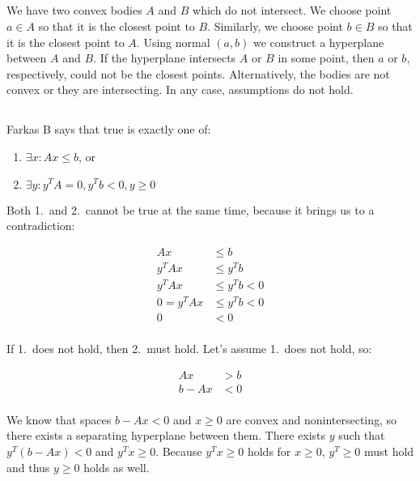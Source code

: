 \documentclass[a4paper,11pt,oneside,onecolumn]{article}
\begin{document}
\subsection{}

We have two convex bodies $A$ and $B$ which do not intersect. We choose point $a \in A$ so that it is the closest point
to $B$. Similarly, we choose
point $b \in B$ so that it is the closest point to $A$. Using normal $(a,b)$ we construct a hyperplane between $A$ and $B$.
If the hyperplane intersects $A$ or $B$ in some point, then $a$ or $b$, respectively, could not be the closest points.
Alternatively, the bodies are not convex or they are intersecting. In any case, assumptions do not hold.

\subsection{}

Farkas B says that true is exactly one of:
\begin{enumerate}
\item $\exists x: Ax \le b$, or
\item $\exists y: y^TA = 0, y^Tb < 0 , y \ge 0$
\end{enumerate}

Both 1.~and 2.~cannot be true at the same time, because it brings us to a contradiction:

\begin{align*}
Ax & \le b \\
y^TAx & \le y^Tb \\
y^TAx & \le y^Tb < 0 \\
0 = y^TAx & \le y^Tb < 0 \\
0 & < 0 \\
\end{align*}

If 1.~does not hold, then 2.~must hold. Let's assume 1.~does not hold, so:

\begin{align*}
Ax & > b \\
b - Ax & < 0 \\
\end{align*}

We know that spaces $b - Ax < 0$ and $x \ge 0$ are convex and nonintersecting, so there exists a separating hyperplane
between them. There exists $y$ such that $y^T(b - Ax) < 0$ and $y^Tx \ge 0$. Because $y^Tx \ge 0$ holds for $x \ge 0$,
$y^T \ge 0$ must hold and thus $y \ge 0$ holds as well.
\end{document}

